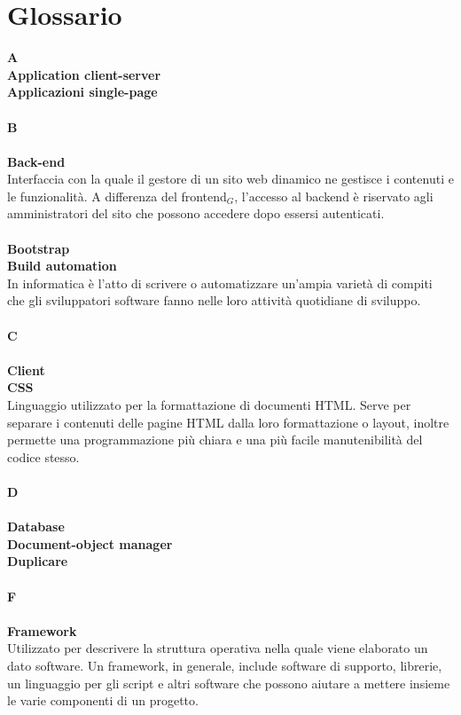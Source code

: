 \chapter{Glossario} \label{Glossario}
\textbf{A} \\
\textbf{Application client-server} \\
\textbf{Applicazioni single-page} \\	
\\
\textbf{B} \\
\\
\textbf{Back-end} \\
Interfaccia con la quale il gestore di un sito web dinamico ne gestisce i contenuti e le funzionalità. A differenza del frontend$_G$, l'accesso al backend è riservato agli amministratori del sito che possono accedere dopo essersi autenticati.\\
\\
\textbf{Bootstrap} \\
\textbf{Build automation} \\
In informatica è l'atto di scrivere o automatizzare un'ampia varietà di compiti che gli sviluppatori software fanno nelle loro attività quotidiane di sviluppo.\\
\\
\textbf{C} \\
\\
\textbf{Client} \\
\textbf{CSS} \\
Linguaggio utilizzato per la formattazione di documenti HTML.
Serve per separare i contenuti delle pagine HTML dalla loro formattazione o layout, inoltre permette una programmazione più chiara e una più facile manutenibilità del codice stesso.\\
\\
\textbf{D} \\
\\
\textbf{Database} \\
\textbf{Document-object manager} \\
\textbf{Duplicare} \\
\\
\textbf{F} \\
\\
\textbf{Framework}\\
Utilizzato per descrivere la struttura operativa nella quale viene elaborato un dato software.
Un framework, in generale, include software di supporto, librerie, un linguaggio per gli script e altri software che possono aiutare a mettere insieme le varie componenti di un progetto.\\
